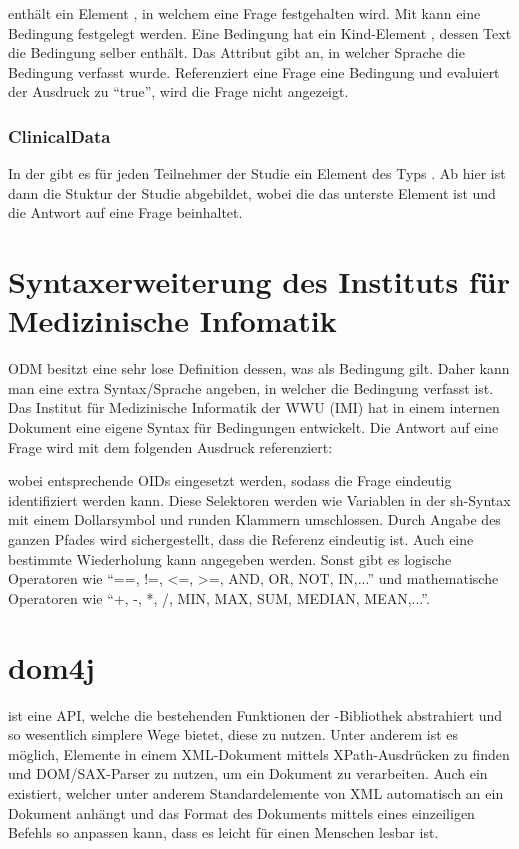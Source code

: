  enthält ein Element , in welchem eine Frage festgehalten wird.
Mit  kann eine Bedingung festgelegt werden.
Eine Bedingung hat ein Kind-Element , dessen Text die Bedingung selber enthält.
Das Attribut  gibt an, in welcher Sprache die Bedingung verfasst wurde.
Referenziert eine Frage eine Bedingung und evaluiert der Ausdruck zu \enquote{true}, wird die Frage nicht angezeigt.

\subsubsection{ClinicalData}

In der  gibt es für jeden Teilnehmer der Studie ein Element des Typs .
Ab hier ist dann die Stuktur der Studie abgebildet, wobei die  das unterste Element ist und die Antwort auf eine Frage beinhaltet.

\section{Syntaxerweiterung des Instituts für Medizinische Infomatik}

ODM besitzt eine sehr lose Definition dessen, was als Bedingung gilt. Daher kann man eine extra Syntax/Sprache angeben, in welcher die Bedingung verfasst ist.
Das Institut für Medizinische Informatik der WWU (IMI) hat in einem internen Dokument eine eigene Syntax für Bedingungen entwickelt.
Die Antwort auf eine Frage wird mit dem folgenden Ausdruck referenziert: 


\noindent wobei entsprechende OIDs eingesetzt werden, sodass die Frage eindeutig identifiziert werden kann.
Diese Selektoren werden wie Variablen in der sh-Syntax mit einem Dollarsymbol und runden Klammern umschlossen.
Durch Angabe des ganzen Pfades wird sichergestellt, dass die Referenz eindeutig ist. Auch eine bestimmte Wiederholung kann angegeben werden.
Sonst gibt es logische Operatoren wie \enquote{==, !=, <=, >=, AND, OR, NOT, IN,...} und mathematische Operatoren wie \enquote{+, -, *, /, MIN, MAX, SUM, MEDIAN, MEAN,...}.

\section{dom4j}

 ist eine API, welche die bestehenden Funktionen der -Bibliothek abstrahiert und so wesentlich simplere Wege bietet, diese zu nutzen\cite{dom4j}.
Unter anderem ist es möglich, Elemente in einem XML-Dokument mittels XPath-Ausdrücken zu finden und DOM/SAX-Parser zu nutzen, um ein Dokument zu verarbeiten.
Auch ein  existiert, welcher unter anderem Standardelemente von XML automatisch an ein Dokument anhängt und das Format des Dokuments mittels eines einzeiligen Befehls so anpassen kann, dass es leicht für einen Menschen lesbar ist.

